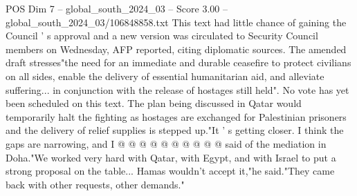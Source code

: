 \begin{textsample}{POS Dim 7 – global\_south\_2024\_03 – Score 3.00 – global\_south\_2024\_03/106848858.txt}
This text had little chance of gaining the Council ' s approval and a new version was circulated to Security Council members on Wednesday, AFP reported, citing diplomatic sources.
The amended draft stresses"the need for an immediate and durable ceasefire to protect civilians on all sides, enable the delivery of essential humanitarian aid, and alleviate suffering... in conjunction with the release of hostages still held".
No vote has yet been scheduled on this text.
The plan being discussed in Qatar would temporarily halt the fighting as hostages are exchanged for Palestinian prisoners and the delivery of relief supplies is stepped up."It ' s getting closer.
I think the gaps are narrowing, and I @ @ @ @ @ @ @ @ @ @ said of the mediation in Doha."We worked very hard with Qatar, with Egypt, and with Israel to put a strong proposal on the table...
Hamas wouldn't accept it,"he said."They came back with other requests, other demands."

\end{textsample}
